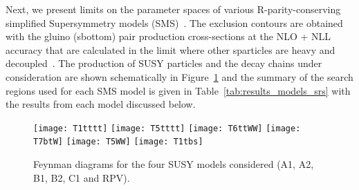 Next, we present limits on the parameter spaces of various
R-parity-conserving simplified Supersymmetry models (SMS)~\cite{sms}.
The exclusion contours are obtained with the gluino (sbottom)
pair production cross-sections at the NLO + NLL accuracy that
are calculated in the limit where other sparticles are heavy and
decoupled~\cite{bib-nlo-nll-01,bib-nlo-nll-02,bib-nlo-nll-03,bib-nlo-nll-04,
bib-nlo-nll-05,Kramer:2012bx}. The production of SUSY particles and
the decay chains under consideration are shown schematically in
Figure~\ref{fig:results_feyn_models} and the summary of the search regions used
for each SMS model is given in Table~\ref{tab:results_models_srs} with the
results from each model discussed below.
\begin{figure}[!htb]
\begin{center}
\texttt{[image: T1tttt]} \hfill
\texttt{[image: T5tttt]}
\texttt{[image: T6ttWW]} \hfill
\texttt{[image: T7btW]}
\texttt{[image: T5WW]} \hfill
\texttt{[image: T1tbs]}
\caption[Diagrams for the four SUSY models considered]
{\label{fig:results_feyn_models}
Feynman diagrams for the four SUSY models considered (A1, A2, B1, B2, C1 and RPV).
}
\end{center}
\end{figure}
